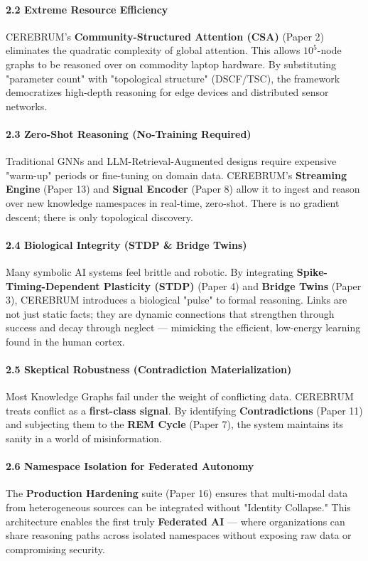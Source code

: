 \paragraph{2.2 Extreme Resource Efficiency}
CEREBRUM's \textbf{Community-Structured Attention (CSA)} (Paper 2) eliminates the quadratic complexity of global attention. This allows $10^5$-node graphs to be reasoned over on commodity laptop hardware. By subst\-ituting "parameter count" with "topological structure" (DSCF/TSC), the framework democ\-ratizes high-depth reasoning for edge devices and distributed sensor networks.

\paragraph{2.3 Zero-Shot Reasoning (No-Training Required)}
Traditional GNNs and LLM-Retrieval-Augmented designs require expensive "warm-up" periods or fine-tuning on domain data. CEREBRUM's \textbf{Streaming Engine} (Paper 13) and \textbf{Signal Encoder} (Paper 8) allow it to ingest and reason over new knowledge namespaces in real-time, zero-shot. There is no gradient descent; there is only topological discovery.

\paragraph{2.4 Biological Integrity (STDP \& Bridge Twins)}
Many symbolic AI systems feel brittle and robotic. By integrating \textbf{Spike-Timing-Dependent Plasticity (STDP)} (Paper 4) and \textbf{Bridge Twins} (Paper 3), CEREBRUM introduces a biological "pulse" to formal reasoning. Links are not just static facts; they are dynamic connections that strengthen through success and decay through neglect — mimicking the efficient, low-energy learning found in the human cortex.

\paragraph{2.5 Skeptical Robustness (Contra\-diction Materi\-alization)}
Most Knowledge Graphs fail under the weight of conflicting data. CEREBRUM treats conflict as a \textbf{first-class signal}. By identifying \textbf{Contra\-dictions} (Paper 11) and subjecting them to the \textbf{REM Cycle} (Paper 7), the system maintains its sanity in a world of misin\-formation.

\paragraph{2.6 Namespace Isolation for Federated Autonomy}
The \textbf{Production Hardening} suite (Paper 16) ensures that multi-modal data from heter\-ogeneous sources can be integrated without "Identity Collapse." This archi\-tecture enables the first truly \textbf{Federated AI} — where organ\-izations can share reasoning paths across isolated namespaces without exposing raw data or compr\-omising security.

